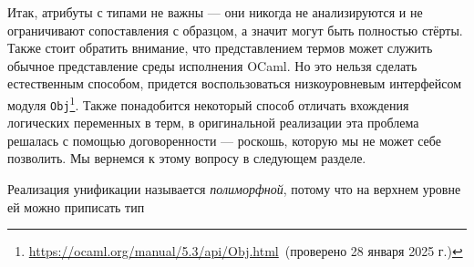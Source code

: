 
Итак, атрибуты с типами не важны --- они никогда не анализируются и не ограничивают сопоставления с образцом, а значит могут быть полностью стёрты.
Также стоит обратить внимание, что представлением термов может служить обычное представление среды исполнения OCaml.
Но это нельзя сделать естественным способом, придется воспользоваться низкоуровневым интерфейсом модуля \lstinline|Obj|\footnote{\url{https://ocaml.org/manual/5.3/api/Obj.html}~(проверено 28 января 2025 г.)}.
Также понадобится некоторый способ отличать вхождения логических переменных в терм, в оригинальной реализации эта проблема решалась с помощью договоренности --- роскошь, которую мы не может себе позволить.
Мы вернемся к этому вопросу в следующем разделе.


Реализация унификации называется \emph{полиморфной}, потому что на верхнем уровне ей можно приписать тип

